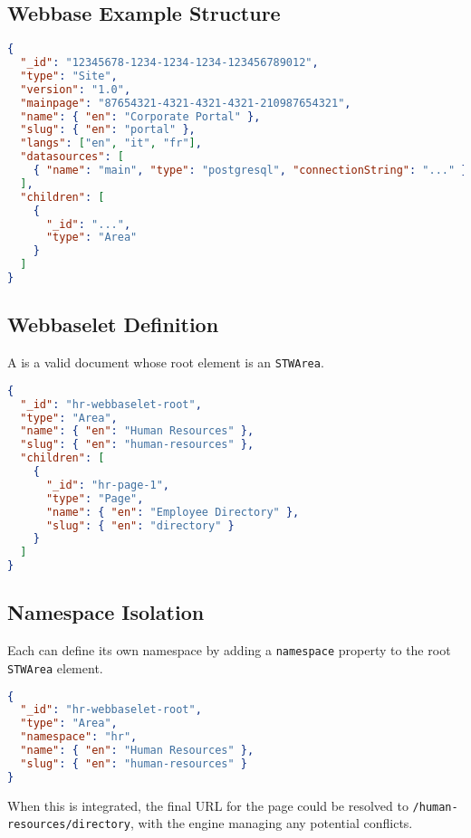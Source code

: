 \subsection{Webbase Example Structure}

\begin{lstlisting}[language=JSON,caption={Basic Webbase Structure in JSON}]
{
  "_id": "12345678-1234-1234-1234-123456789012",
  "type": "Site",
  "version": "1.0",
  "mainpage": "87654321-4321-4321-4321-210987654321",
  "name": { "en": "Corporate Portal" },
  "slug": { "en": "portal" },
  "langs": ["en", "it", "fr"],
  "datasources": [
    { "name": "main", "type": "postgresql", "connectionString": "..." }
  ],
  "children": [
    {
      "_id": "...",
      "type": "Area"
    }
  ]
}
\end{lstlisting}

\subsection{Webbaselet Definition}

A \webbaselet{} is a valid \wbdl{} document whose root element is an \texttt{STWArea}.

\begin{lstlisting}[language=JSON,caption={Example of a Webbaselet in JSON}]
{
  "_id": "hr-webbaselet-root",
  "type": "Area",
  "name": { "en": "Human Resources" },
  "slug": { "en": "human-resources" },
  "children": [
    {
      "_id": "hr-page-1",
      "type": "Page",
      "name": { "en": "Employee Directory" },
      "slug": { "en": "directory" }
    }
  ]
}
\end{lstlisting}

\subsection{Namespace Isolation}

Each \webbaselet{} can define its own namespace by adding a \texttt{namespace} property to the root \texttt{STWArea} element.

\begin{lstlisting}[language=JSON,caption={Webbaselet with Namespace}]
{
  "_id": "hr-webbaselet-root",
  "type": "Area",
  "namespace": "hr",
  "name": { "en": "Human Resources" },
  "slug": { "en": "human-resources" }
}
\end{lstlisting}

When this \webbaselet{} is integrated, the final URL for the page could be resolved to \texttt{/human-resources/directory}, with the engine managing any potential conflicts.

